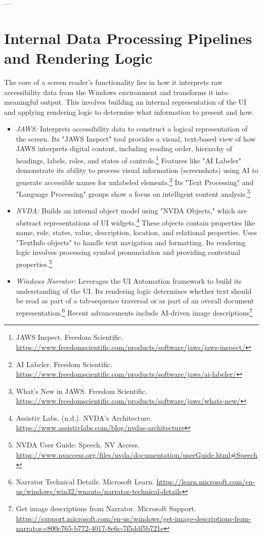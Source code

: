 ---

\section{Internal Data Processing Pipelines and Rendering Logic}
\label{sec:data-pipelines}

The core of a screen reader's functionality lies in how it interprets raw accessibility data from the Windows environment and transforms it into meaningful output. This involves building an internal representation of the UI and applying rendering logic to determine what information to present and how.

\begin{itemize}
    \item \emph{JAWS:} Interprets accessibility data to construct a logical representation of the screen. Its "JAWS Inspect" tool provides a visual, text-based view of how JAWS interprets digital content, including reading order, hierarchy of headings, labels, roles, and states of controls.\footnote{JAWS Inspect. Freedom Scientific. \url{https://www.freedomscientific.com/products/software/jaws/jaws-inspect/}} Features like "AI Labeler" demonstrate its ability to process visual information (screenshots) using AI to generate accessible names for unlabeled elements.\footnote{AI Labeler. Freedom Scientific. \url{https://www.freedomscientific.com/products/software/jaws/ai-labeler/}} Its "Text Processing" and "Language Processing" groups show a focus on intelligent content analysis.\footnote{What's New in JAWS. Freedom Scientific. \url{https://www.freedomscientific.com/products/software/jaws/whats-new/}}
    \item \emph{NVDA:} Builds an internal object model using "NVDA Objects," which are abstract representations of UI widgets.\footnote{Assistiv Labs. (n.d.). NVDA's Architecture. \url{https://www.assistivlabs.com/blog/nvdas-architecture}} These objects contain properties like name, role, states, value, description, location, and relational properties. Uses "TextInfo objects" to handle text navigation and formatting. Its rendering logic involves processing symbol pronunciation and providing contextual properties.\footnote{NVDA User Guide: Speech. NV Access. \url{https://www.nvaccess.org/files/nvda/documentation/userGuide.html\#Speech}}
    \item \emph{Windows Narrator:} Leverages the UI Automation framework to build its understanding of the UI. Its rendering logic determines whether text should be read as part of a tab-sequence traversal or as part of an overall document representation.\footnote{Narrator Technical Details. Microsoft Learn. \url{https://learn.microsoft.com/en-us/windows/win32/wnauto/narrator-technical-details}} Recent advancements include AI-driven image descriptions\footnote{Get image descriptions from Narrator. Microsoft Support. \url{https://support.microsoft.com/en-us/windows/get-image-descriptions-from-narrator-c800c765-b772-4017-8e6c-7f5ddf5b721e}}

\end{itemize}
